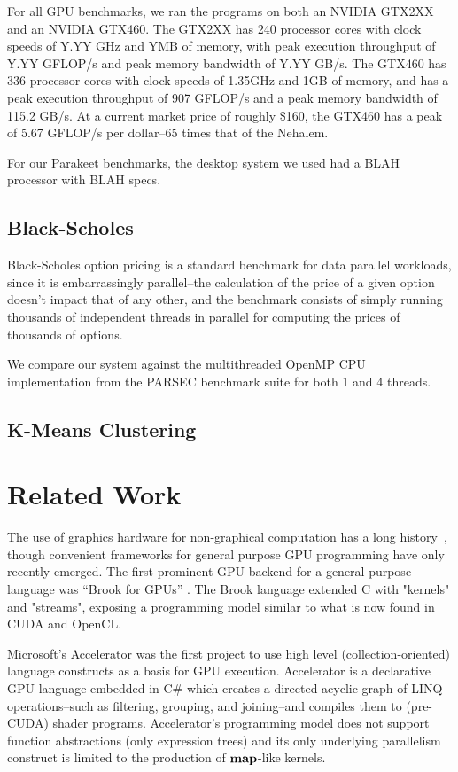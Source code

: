 \documentclass[preprint]{sigplanconf}
\begin{document}
For all GPU benchmarks, we ran the programs on both an NVIDIA GTX2XX and an
NVIDIA GTX460.  The GTX2XX has 240 processor cores with clock speeds of
Y.YY GHz and YMB of memory, with peak execution throughput of Y.YY GFLOP/s and
peak memory bandwidth of Y.YY GB/s.  The GTX460 has 336 processor cores with
clock speeds of 1.35GHz and 1GB of memory, and has a peak execution throughput
of 907 GFLOP/s and a peak memory bandwidth of 115.2 GB/s.  At a current market
price of roughly \$160, the GTX460 has a peak of 5.67 GFLOP/s per dollar--65
times that of the Nehalem.

For our Parakeet benchmarks, the desktop system we used had a BLAH processor
with BLAH specs.

\subsection{Black-Scholes}
Black-Scholes option pricing \cite{Blac73} is a standard benchmark for data
parallel workloads, since it is embarrassingly parallel--the calculation of the
price of a given option doesn't impact that of any other, and the benchmark
consists of simply running thousands of independent threads in parallel for
computing the prices of thousands of options.

We compare our system against the multithreaded OpenMP CPU implementation
from the PARSEC \cite{Bien08} benchmark suite for both 1 and 4 threads.

\subsection{K-Means Clustering}


\section{Related Work}
\label{RelatedWork}
The use of graphics hardware for non-graphical computation has a long history~\cite{Lengyel90}, though convenient frameworks for general purpose GPU programming have only recently emerged.
The first prominent GPU backend for a general purpose language was ``Brook for
GPUs'' \cite{Buck04}. The Brook language extended C with "kernels" and
"streams", exposing a programming model similar to what is now found in CUDA and
OpenCL. 

Microsoft's Accelerator\cite{Tard06} was the first project to use high level
(collection-oriented) language constructs as a basis for GPU execution.
Accelerator is a declarative GPU language embedded in C\# which creates a
directed acyclic graph of LINQ operations--such as filtering, grouping, and
joining--and compiles them to
(pre-CUDA) shader programs. Accelerator's programming model does not support
function abstractions (only expression trees) and its only underlying
parallelism construct is limited to the production of $\mbox{\textbf{map}}$-like kernels. 
\end{document}
